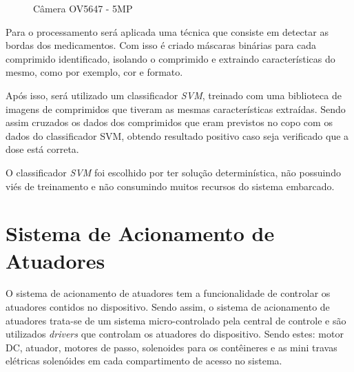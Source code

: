     \begin{figure}[H]
    \centering
    \hspace{0.1\textwidth}
    \caption{Câmera OV5647 - 5MP}\label{fig:camera_process}
    \end{figure}
    
    Para o processamento será aplicada uma técnica que consiste em detectar as bordas dos medicamentos. Com isso é criado máscaras binárias para cada comprimido identificado, isolando o comprimido e extraindo características do mesmo, como por exemplo, cor e formato.
    
    Após isso, será utilizado um classificador \textit{SVM}, treinado com uma biblioteca de imagens de comprimidos que tiveram as mesmas características extraídas. Sendo assim cruzados os dados dos comprimidos que eram previstos no copo com os dados do classificador SVM, obtendo resultado positivo caso seja verificado que a dose está correta. 
    
    O classificador \textit{SVM} foi escolhido por ter solução determinística, não possuindo viés de treinamento e não consumindo muitos recursos do sistema embarcado. 

\section{Sistema de Acionamento de Atuadores}
     
    O sistema de acionamento de atuadores tem a funcionalidade de controlar os atuadores contidos no dispositivo. Sendo assim, o sistema de acionamento de atuadores  trata-se de um sistema micro-controlado pela central de controle e são utilizados \textit{drivers} que controlam os atuadores do dispositivo. Sendo estes: motor DC, atuador, motores de passo, solenoides para os contêineres e as mini travas elétricas solenóides em cada compartimento de acesso no sistema. 

